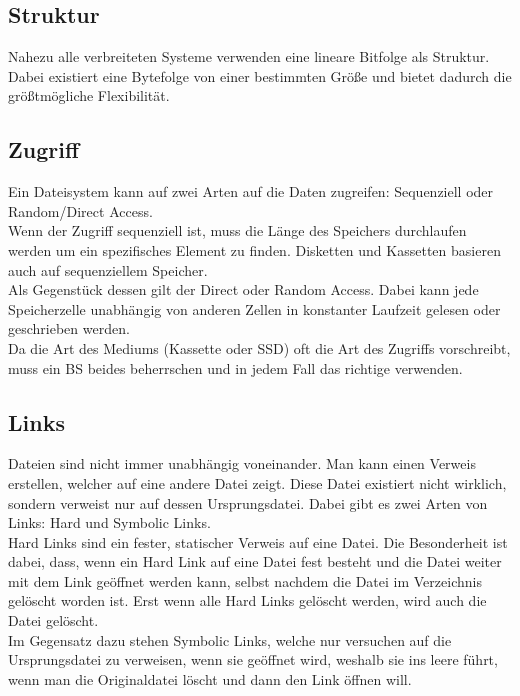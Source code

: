 \documentclass{article}
\begin{document}
	\subsection{Struktur}
	Nahezu alle verbreiteten Systeme verwenden eine lineare Bitfolge als Struktur. Dabei existiert eine Bytefolge von einer bestimmten Größe und bietet dadurch die größtmögliche Flexibilität.
	\subsection{Zugriff}
	Ein Dateisystem kann auf zwei Arten auf die Daten zugreifen: Sequenziell oder Random/Direct Access. \\
	Wenn der Zugriff sequenziell ist, muss die Länge des Speichers durchlaufen werden um ein spezifisches Element zu finden. Disketten und Kassetten basieren auch auf sequenziellem Speicher. \\
	Als Gegenstück dessen gilt der Direct oder Random Access. Dabei kann jede Speicherzelle unabhängig von anderen Zellen in konstanter Laufzeit gelesen oder geschrieben werden. \\
	Da die Art des Mediums (Kassette oder SSD) oft die Art des Zugriffs vorschreibt, muss ein BS beides beherrschen und in jedem Fall das richtige verwenden. \\
	\subsection{Links}
	Dateien sind nicht immer unabhängig voneinander. Man kann einen Verweis erstellen, welcher auf eine andere Datei zeigt. Diese Datei existiert nicht wirklich, sondern verweist nur auf dessen Ursprungsdatei. Dabei gibt es zwei Arten von Links: Hard und Symbolic Links. \\
	Hard Links sind ein fester, statischer Verweis auf eine Datei. Die Besonderheit ist dabei, dass, wenn ein Hard Link auf eine Datei fest besteht und die Datei weiter mit dem Link geöffnet werden kann, selbst nachdem die Datei im Verzeichnis gelöscht worden ist. Erst wenn alle Hard Links gelöscht werden, wird auch die Datei gelöscht. \\
	Im Gegensatz dazu stehen Symbolic Links, welche nur versuchen auf die Ursprungsdatei zu verweisen, wenn sie geöffnet wird, weshalb sie ins leere führt, wenn man die Originaldatei löscht und dann den Link öffnen will.
\end{document}
